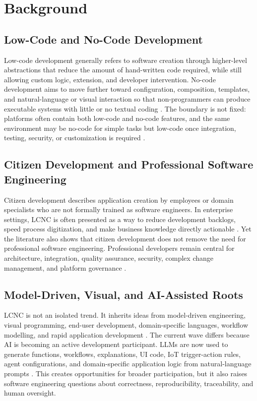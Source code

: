 \documentclass[conference]{IEEEtran}
\begin{document}
\section{Background}
\subsection{Low-Code and No-Code Development}
Low-code development generally refers to software creation through higher-level abstractions that reduce the amount of hand-written code required, while still allowing custom logic, extension, and developer intervention. No-code development aims to move further toward configuration, composition, templates, and natural-language or visual interaction so that non-programmers can produce executable systems with little or no textual coding \cite{p02,p04,p19,p29}. The boundary is not fixed: platforms often contain both low-code and no-code features, and the same environment may be no-code for simple tasks but low-code once integration, testing, security, or customization is required \cite{p22,p34,p49}.

\subsection{Citizen Development and Professional Software Engineering}
Citizen development describes application creation by employees or domain specialists who are not formally trained as software engineers. In enterprise settings, LCNC is often presented as a way to reduce development backlogs, speed process digitization, and make business knowledge directly actionable \cite{p13,p14,p16,p18}. Yet the literature also shows that citizen development does not remove the need for professional software engineering. Professional developers remain central for architecture, integration, quality assurance, security, complex change management, and platform governance \cite{p30,p32,p43,p47,p49}.

\subsection{Model-Driven, Visual, and AI-Assisted Roots}
LCNC is not an isolated trend. It inherits ideas from model-driven engineering, visual programming, end-user development, domain-specific languages, workflow modelling, and rapid application development \cite{p20,p29,p33,p43}. The current wave differs because AI is becoming an active development participant. LLMs are now used to generate functions, workflows, explanations, UI code, IoT trigger-action rules, agent configurations, and domain-specific application logic from natural-language prompts \cite{p04,p05,p07,p08,p31,p35,p39,p40}. This creates opportunities for broader participation, but it also raises software engineering questions about correctness, reproducibility, traceability, and human oversight.
\end{document}
